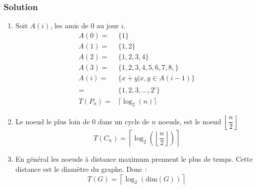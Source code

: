 \subsubsection*{Solution}
\begin{enumerate}

	\item Soit $A(i)$, les amis de $0$ au jour $i$.
\begin{align*}
    A(0) =& \{1 \} \\
    A(1) =& \{1,2 \}\\
    A(2) =& \{1,2,3,4 \}\\
    A(3) =& \{1,2,3,4,5,6,7,8, \}\\
    A(i) =& \{x+y | x,y \in A(i-1) \} \\
         =& \{1,2,3,..., 2^i \} \\
    T(P_n) =& \lceil \log_2 (n) \rceil
\end{align*}


	\item Le noeud le plus loin de $0$ dans un cycle de $n$ noeuds, est le noeud $\left\lfloor \dfrac{n}{2} \right\rfloor$
$$ T(C_n) = \left\lceil \log_2 \left(\left\lfloor \dfrac{n}{2} \right\rfloor \right) \right\rceil $$

	\item En général les noeuds à distance maximum prennent le plus de temps. Cette distance est le diamètre du graphe. Donc :
$$ T(G) = \left\lceil \log_2 \left( \text{dim}(G) \right) \right\rceil $$


\end{enumerate}
%
%
%
%
%
%
%
%
%
